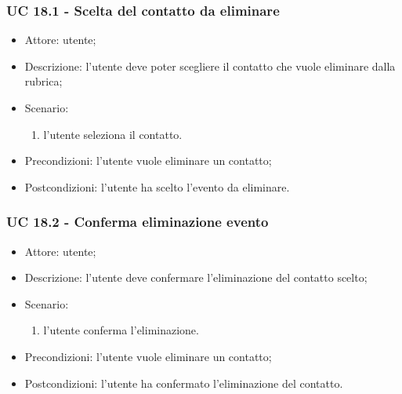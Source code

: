 \subsubsection{UC 18.1 - Scelta del contatto da eliminare} \label{sec: UC 18.1}
\begin{itemize}
    \item Attore: utente;
    \item Descrizione: l'utente deve poter scegliere il contatto che vuole eliminare dalla rubrica;
    \item Scenario:
        \begin{enumerate}
        \item l'utente seleziona il contatto.
        \end{enumerate}
    
    \item Precondizioni: l'utente vuole eliminare un contatto;
    \item Postcondizioni: l'utente ha scelto l'evento da eliminare.
\end{itemize}


\subsubsection{UC 18.2 - Conferma eliminazione evento} \label{sec: UC 18.2}
\begin{itemize}
    \item Attore: utente;
    \item Descrizione: l'utente deve confermare l'eliminazione del contatto scelto;
    \item Scenario:
        \begin{enumerate}
        \item l'utente conferma l'eliminazione.
        \end{enumerate}
    
    \item Precondizioni: l'utente vuole eliminare un contatto;
    \item Postcondizioni: l'utente ha confermato l'eliminazione del contatto.
\end{itemize}



